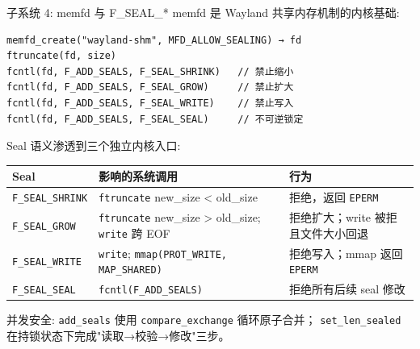\documentclass[aspectratio=169,10pt]{ctexbeamer}
\newcommand{\code}[1]{\texttt{#1}}
\begin{document}
\begin{frame}[fragile,shrink=25]{子系统 4: memfd 与 F\_SEAL\_*}
memfd 是 Wayland 共享内存机制的内核基础:

\begin{verbatim}
memfd_create("wayland-shm", MFD_ALLOW_SEALING) → fd
ftruncate(fd, size)
fcntl(fd, F_ADD_SEALS, F_SEAL_SHRINK)   // 禁止缩小
fcntl(fd, F_ADD_SEALS, F_SEAL_GROW)     // 禁止扩大
fcntl(fd, F_ADD_SEALS, F_SEAL_WRITE)    // 禁止写入
fcntl(fd, F_ADD_SEALS, F_SEAL_SEAL)     // 不可逆锁定
\end{verbatim}

\vspace{1mm}
Seal 语义渗透到三个独立内核入口:

\begin{tabularx}{\textwidth}{p{2.5cm} p{4cm} X}
\toprule
\textbf{Seal} & \textbf{影响的系统调用} & \textbf{行为} \\
\midrule
\texttt{F\_SEAL\_SHRINK} & \texttt{ftruncate} new\_size < old\_size & 拒绝，返回 \texttt{EPERM} \\
\texttt{F\_SEAL\_GROW} &
  \texttt{ftruncate} new\_size > old\_size; \texttt{write} 跨 EOF &
  拒绝扩大；write 被拒且文件大小回退 \\
\texttt{F\_SEAL\_WRITE} &
  \texttt{write}; \texttt{mmap(PROT\_WRITE, MAP\_SHARED)} &
  拒绝写入；mmap 返回 \texttt{EPERM} \\
\texttt{F\_SEAL\_SEAL} & \texttt{fcntl(F\_ADD\_SEALS)} & 拒绝所有后续 seal 修改 \\
\bottomrule
\end{tabularx}

并发安全: \code{add_seals} 使用 \code{compare_exchange} 循环原子合并；
\code{set_len_sealed} 在持锁状态下完成"读取→校验→修改"三步。
\end{frame}

\end{document}
